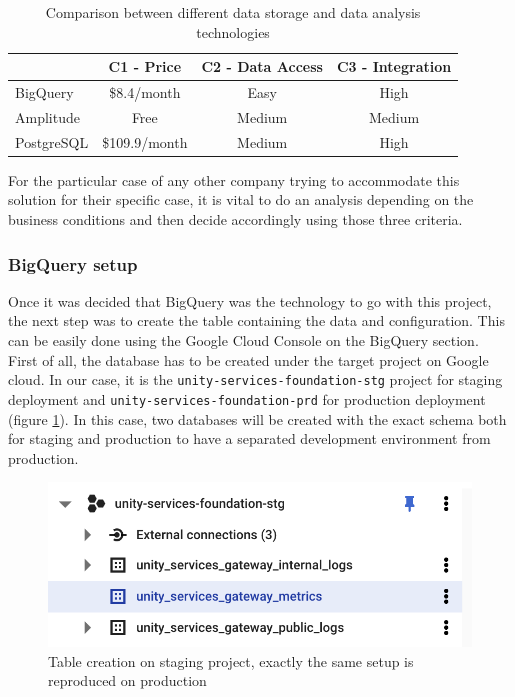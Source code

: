 \documentclass[english, 12pt, a4paper, sci, utf8, a-1b, online]{aaltothesis}
\begin{document}
\begin{table}[h!]
\centering
\begin{tabular}{|l|c|c|c|}
\hline
           & C1 - Price    & C2 - Data Access & C3 - Integration \\ \hline\hline
BigQuery   & \$8.4/month   & Easy             & High             \\
Amplitude  & Free          & Medium           & Medium           \\
PostgreSQL & \$109.9/month & Medium           & High             \\ \hline 
\end{tabular}
\caption{Comparison between different data storage and data analysis technologies}
\label{tab:data-souces}
\end{table}

For the particular case of any other company trying to accommodate this solution for their specific case, it is vital to do an analysis depending on the business conditions and then decide accordingly using those three criteria.

\subsubsection{BigQuery setup}

Once it was decided that BigQuery was the technology to go with this project, the next step was to create the table containing the data and configuration. This can be easily done using the Google Cloud Console on the BigQuery section.\\

First of all, the database has to be created under the target project on Google cloud. In our case, it is the \texttt{unity-services-foundation-stg} project for staging deployment and \texttt{unity-services-foundation-prd} for production deployment (figure \ref{fig:bigquery-creation}). In this case, two databases will be created with the exact schema both for staging and production to have a separated development environment from production.

\begin{figure}[h!]
    \centering
    \includegraphics[scale=0.3]{src/thesis/img/technical-solution/table-creation.png}
    \caption{Table creation on staging project, exactly the same setup is reproduced on production}
    \label{fig:bigquery-creation}
\end{figure}
\end{document}
